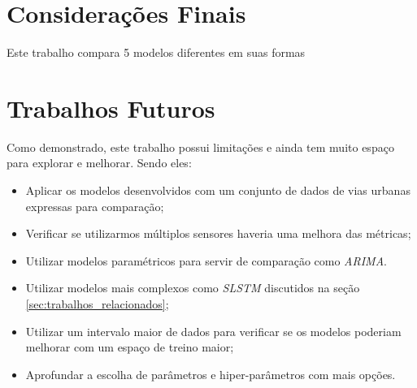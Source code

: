 
\section{Considerações Finais}

Este trabalho compara 5 modelos diferentes em suas formas 

\section{Trabalhos Futuros}

Como demonstrado, este trabalho possui limitações e ainda tem muito espaço para explorar e melhorar. Sendo eles:

\begin{itemize}
    \item Aplicar os modelos desenvolvidos com um conjunto de dados de vias urbanas expressas para comparação;
    \item Verificar se utilizarmos múltiplos sensores haveria uma melhora das métricas;
    \item Utilizar modelos paramétricos para servir de comparação como \textit{\acrshort{ARIMA}}.
    \item Utilizar modelos mais complexos como \textit{\acrshort{SLSTM}} discutidos na seção \ref{sec:trabalhos_relacionados};
    \item Utilizar um intervalo maior de dados para verificar se os modelos poderiam melhorar com um espaço de treino maior;
    \item Aprofundar a escolha de parâmetros e hiper-parâmetros com mais opções.
\end{itemize}